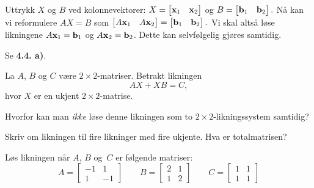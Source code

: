 \begin{losning}
\begin{punkt}
Uttrykk $X$ og $B$ ved kolonnevektorer: $X=\begin{bmatrix}
\mathbf{x}_1 & \mathbf{x}_2
\end{bmatrix}$ og $B=\begin{bmatrix}
\mathbf{b}_1 & \mathbf{b}_2
\end{bmatrix}.$ Nå kan vi reformulere $AX=B$ som $\begin{bmatrix}
A\mathbf{x}_1 & A\mathbf{x}_2
\end{bmatrix}=\begin{bmatrix}
\mathbf{b}_1 & \mathbf{b}_2
\end{bmatrix}.$ Vi skal altså løse likningene $A\mathbf{x}_1=\mathbf{b}_1$ og $A\mathbf{x}_2=\mathbf{b}_2$. Dette kan selvfølgelig gjøres samtidig.
\end{punkt}

\begin{punkt}
Se \textbf{4.4. a)}.
\end{punkt}

\end{losning}

\begin{oppgave}
La $A$, $B$ og $C$ være  $2\times 2$-matriser. Betrakt likningen $$AX+XB=C,$$ hvor $X$ er en ukjent $2\times 2$-matrise.

\begin{punkt}
Hvorfor kan man \emph{ikke} løse denne likningen som to $2\times 2$-likningssystem samtidig?
\end{punkt}

\begin{punkt}
Skriv om likningen til fire likninger med fire ukjente. Hva er totalmatrisen? 
\end{punkt}


\begin{punkt}
Løs likningen når $A$, $B$ og~$C$ er følgende matriser:
\[
A=\begin{bmatrix}
-1 & 1\\
1 & -1
\end{bmatrix}
\qquad
B=\begin{bmatrix}
2 & 1\\
1 & 2
\end{bmatrix}
\qquad
C=\begin{bmatrix}
1 & 1\\
1 & 1
\end{bmatrix}
\]
\end{punkt}

\end{oppgave}


